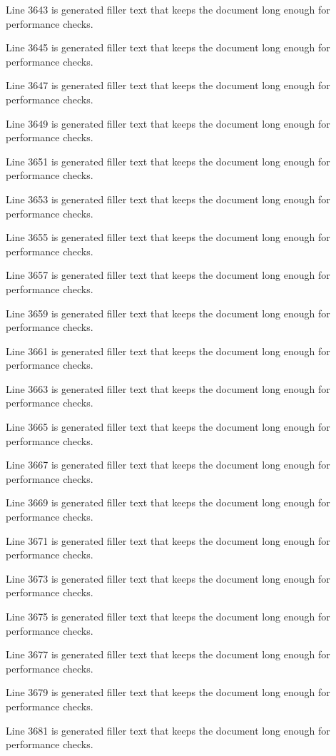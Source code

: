 Line 3643 is generated filler text that keeps the document long enough for performance checks.

Line 3645 is generated filler text that keeps the document long enough for performance checks.

Line 3647 is generated filler text that keeps the document long enough for performance checks.

Line 3649 is generated filler text that keeps the document long enough for performance checks.

Line 3651 is generated filler text that keeps the document long enough for performance checks.

Line 3653 is generated filler text that keeps the document long enough for performance checks.

Line 3655 is generated filler text that keeps the document long enough for performance checks.

Line 3657 is generated filler text that keeps the document long enough for performance checks.

Line 3659 is generated filler text that keeps the document long enough for performance checks.

Line 3661 is generated filler text that keeps the document long enough for performance checks.

Line 3663 is generated filler text that keeps the document long enough for performance checks.

Line 3665 is generated filler text that keeps the document long enough for performance checks.

Line 3667 is generated filler text that keeps the document long enough for performance checks.

Line 3669 is generated filler text that keeps the document long enough for performance checks.

Line 3671 is generated filler text that keeps the document long enough for performance checks.

Line 3673 is generated filler text that keeps the document long enough for performance checks.

Line 3675 is generated filler text that keeps the document long enough for performance checks.

Line 3677 is generated filler text that keeps the document long enough for performance checks.

Line 3679 is generated filler text that keeps the document long enough for performance checks.

Line 3681 is generated filler text that keeps the document long enough for performance checks.

